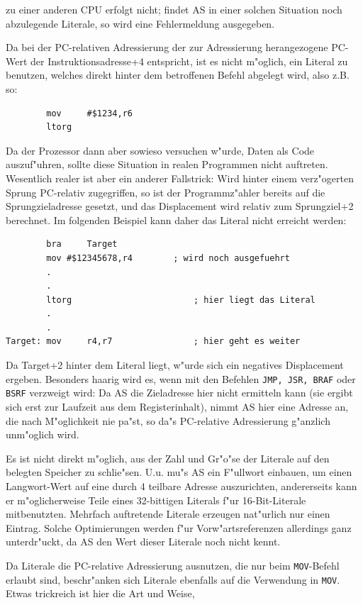 \documentclass[12pt,a4paper,twoside]{report}
\newcommand{\tty}[1]{{\tt #1}}
\newcommand{\asname}{AS}
\begin{document}
zu einer anderen CPU erfolgt nicht; findet \asname{} in einer solchen Situation
noch abzulegende Literale, so wird eine Fehlermeldung ausgegeben.
\par
Da bei der PC-relativen Adressierung der zur Adressierung herangezogene
PC-Wert der Instruktionsadresse+4 entspricht, ist es nicht m"oglich, ein
Literal zu benutzen, welches direkt hinter dem betroffenen Befehl abgelegt
wird, also z.B. so:
\begin{verbatim}
        mov     #$1234,r6
        ltorg
\end{verbatim}
Da der Prozessor dann aber sowieso versuchen w"urde, Daten als Code
auszuf"uhren, sollte diese Situation in realen Programmen nicht auftreten.
Wesentlich realer ist aber ein anderer Fallstrick:  Wird hinter einem
verz"ogerten Sprung PC-relativ zugegriffen, so ist der Programmz"ahler
bereits auf die Sprungzieladresse gesetzt, und das Displacement wird
relativ zum Sprungziel+2 berechnet.  Im folgenden Beispiel kann daher
das Literal nicht erreicht werden:
\begin{verbatim}
        bra     Target
        mov	#$12345678,r4        ; wird noch ausgefuehrt
        .
        .
        ltorg                        ; hier liegt das Literal
        .
        .
Target: mov     r4,r7                ; hier geht es weiter
\end{verbatim}
Da Target+2 hinter dem Literal liegt, w"urde sich ein negatives
Displacement ergeben.  Besonders haarig wird es, wenn mit den
Befehlen \tty{JMP, JSR, BRAF} oder \tty{BSRF} verzweigt wird:  Da \asname{} die
Zieladresse hier nicht ermitteln kann (sie ergibt sich erst zur
Laufzeit aus dem Registerinhalt), nimmt \asname{} hier eine Adresse an,
die nach M"oglichkeit nie pa"st, so da"s PC-relative Adressierung g"anzlich
unm"oglich wird.
\par
Es ist nicht direkt m"oglich, aus der Zahl und Gr"o"se der Literale
auf den belegten Speicher zu schlie"sen.  U.u. mu"s \asname{} ein F"ullwort
einbauen, um einen Langwort-Wert auf eine durch 4 teilbare Adresse
auszurichten, andererseits kann er m"oglicherweise Teile eines
32-bittigen Literals f"ur 16-Bit-Literale mitbenutzten.  Mehrfach
auftretende Literale erzeugen nat"urlich nur einen Eintrag.  Solche
Optimierungen werden f"ur Vorw"artsreferenzen allerdings ganz
unterdr"uckt, da \asname{} den Wert dieser Literale noch nicht kennt.
\par
Da Literale die PC-relative Adressierung ausnutzen, die nur beim
\tty{MOV}-Befehl erlaubt sind, beschr"anken sich Literale ebenfalls auf
die Verwendung in \tty{MOV}.  Etwas trickreich ist hier die Art und Weise,
\end{document}

